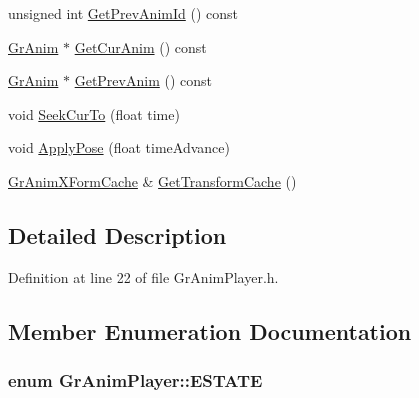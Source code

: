 \begin{CompactItemize}
\begin{CompactItemize}
\item 
unsigned int \hyperlink{class_gr_anim_player_cafb2a806f7e0cc45be6e97a34873002}{GetPrevAnimId} () const 
\item 
\hyperlink{class_gr_anim}{GrAnim} $\ast$ \hyperlink{class_gr_anim_player_2df1bb7e8c64335491c37aa32ede5b50}{GetCurAnim} () const 
\item 
\hyperlink{class_gr_anim}{GrAnim} $\ast$ \hyperlink{class_gr_anim_player_a549030741fea082faa485d1140bc6f7}{GetPrevAnim} () const 
\item 
void \hyperlink{class_gr_anim_player_41f92c3573552814fb744a27f0a6259b}{SeekCurTo} (float time)
\item 
void \hyperlink{class_gr_anim_player_5a21c0ec51c825365b37a34b05cbfad5}{ApplyPose} (float timeAdvance)
\item 
\hyperlink{class_gr_anim_x_form_cache}{GrAnimXFormCache} \& \hyperlink{class_gr_anim_player_823964a43c7ce36bd427741807c83b93}{GetTransformCache} ()
\end{CompactItemize}


\subsection{Detailed Description}


Definition at line 22 of file GrAnimPlayer.h.

\subsection{Member Enumeration Documentation}
\hypertarget{class_gr_anim_player_b3c2ba6a58db17d254f4591ac28a0a75}{
\subsubsection[{ESTATE}]{\setlength{\rightskip}{0pt plus 5cm}enum {\bf GrAnimPlayer::ESTATE}}}
\label{class_gr_anim_player_b3c2ba6a58db17d254f4591ac28a0a75}



\end{CompactItemize}
